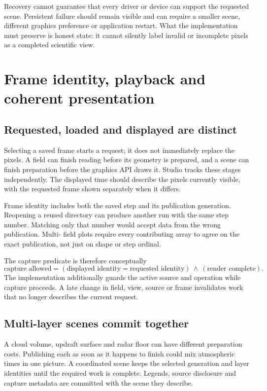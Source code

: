 Recovery cannot guarantee that every driver or device can support the requested
scene. Persistent failure should remain visible and can require a smaller scene,
different graphics preference or application restart. What the implementation
must preserve is honest state: it cannot silently label invalid or incomplete
pixels as a completed scientific view.

\section{Frame identity, playback and coherent presentation}
\subsection{Requested, loaded and displayed are distinct}
Selecting a saved frame starts a request; it does not immediately replace the
pixels. A field can finish reading before its geometry is prepared, and a scene
can finish preparation before the graphics API draws it. Studio tracks these
stages independently. The displayed time should describe the pixels currently
visible, with the requested frame shown separately when it differs.

Frame identity includes both the saved step and its publication generation.
Reopening a reused directory can produce another run with the same step number.
Matching only that number would accept data from the wrong publication. Multi-
field plots require every contributing array to agree on the exact publication,
not just on shape or step ordinal.

The capture predicate is therefore conceptually
\begin{equation}
 \text{capture allowed} =
 (\text{displayed identity}=\text{requested identity})
 \ \land\ (\text{render complete}).
\end{equation}
The implementation additionally guards the active source and operation while
capture proceeds. A late change in field, view, source or frame invalidates work
that no longer describes the current request.



\subsection{Multi-layer scenes commit together}
A cloud volume, updraft surface and radar floor can have different preparation
costs. Publishing each as soon as it happens to finish could mix atmospheric
times in one picture. A coordinated scene keeps the selected generation and
layer identities until the required work is complete. Legends, source disclosure
and capture metadata are committed with the scene they describe.

